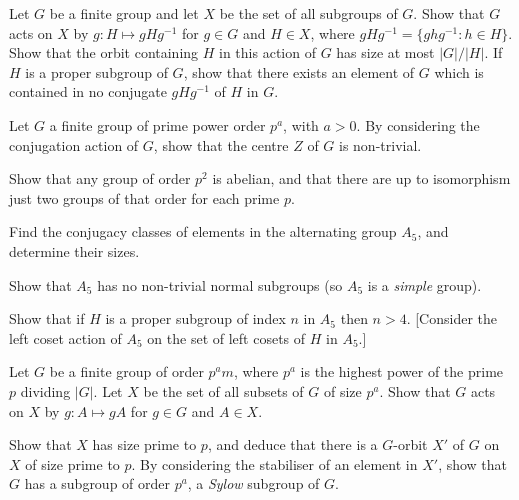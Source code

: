 \begin{problem}
Let $G$ be a finite group and let $X$ be the set of all subgroups of $G$. Show that $G$ acts on $X$ by $g : H \mapsto g H g^{-1}$ for $g \in G$ and $H \in X$, where $g H g^{-1} = \{ g h g^{-1} : h \in H\}$. Show that the orbit containing $H$ in this action of $G$ has size at most $|G|/|H|$. If $H$ is a proper subgroup of $G$, show that there exists an element of $G$ which is contained in no conjugate $g H g^{-1}$ of $H$ in $G$.

\end{problem} 

\begin{solution}[\bf Solution.]

\end{solution}

\begin{problem}
Let $G$ a finite group of prime power order $p^a$, with $a > 0$. By considering the conjugation action of $G$, show that the centre $Z$ of $G$ is non-trivial.

Show that any group of order $p^2$ is abelian, and that there are up to isomorphism just two groups of that order for each prime $p$.

\end{problem} 

\begin{solution}[\bf Solution.]

\end{solution}

\begin{problem}
Find the conjugacy classes of elements in the alternating group $A_5$, and determine their sizes. 

Show that $A_5$ has no non-trivial normal subgroups (so $A_5$ is a \emph{simple} group).

Show that if $H$ is a proper subgroup of index $n$ in $A_5$ then $n > 4$. [Consider the left coset action of $A_5$ on the set of left cosets of $H$ in $A_5$.]

\end{problem} 

\begin{solution}[\bf Solution.]

\end{solution}

\begin{problem}
Let $G$ be a finite group of order $p^a m$, where $p^a$ is the highest power of the prime $p$ dividing $|G|$. Let $X$ be the set of all subsets of $G$ of size $p^a$. Show that $G$ acts on $X$ by $g : A \mapsto g A$ for $g \in G$ and $A\in X$.

Show that $X$ has size prime to $p$, and deduce that there is a $G$-orbit $X'$ of $G$ on $X$ of size prime to $p$. By considering the stabiliser of an element in $X'$, show that $G$ has a subgroup of order $p^a$, a \emph{Sylow} subgroup of $G$.

\end{problem} 

